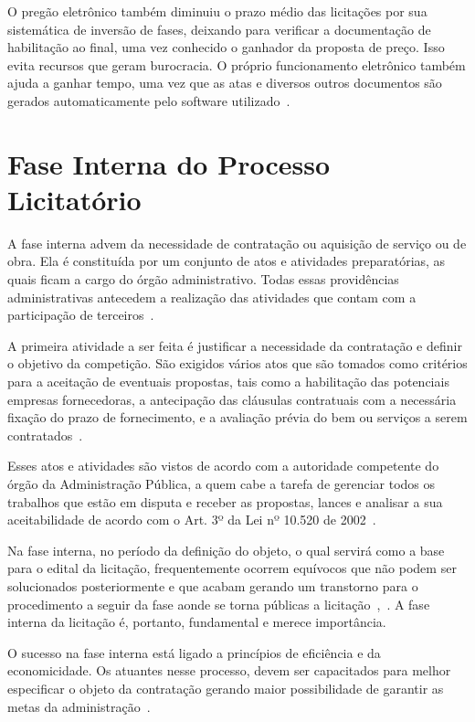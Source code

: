 O pregão eletrônico também diminuiu o prazo médio das licitações por sua sistemática de inversão de fases, deixando para verificar a documentação de habilitação ao final, uma vez conhecido o ganhador da proposta de preço.
Isso evita recursos que geram burocracia. 
O próprio funcionamento eletrônico também ajuda a ganhar tempo, uma vez que as atas e diversos outros documentos são gerados automaticamente pelo software utilizado~\cite{mello2016licitaccao}. 


\chapter[Fase Interna do Processo Licitatório]{Fase Interna do Processo Licitatório}\label{Capitulo2}

A fase interna advem da necessidade de contratação ou aquisição de serviço ou de obra.
Ela é constituída por um conjunto de atos e atividades preparatórias, as quais ficam a cargo do órgão administrativo.
Todas essas providências administrativas antecedem a realização das atividades que contam com a participação de terceiros~\cite{meirelles2011direito}.

A primeira atividade a ser feita é justificar a necessidade da contratação e definir o objetivo da competição.
São exigidos vários atos que são tomados como critérios para a aceitação de eventuais propostas, tais como a habilitação das potenciais empresas fornecedoras, a antecipação das cláusulas contratuais com a necessária fixação do prazo de fornecimento, e a avaliação prévia do bem ou serviços a serem contratados~\cite{carvalho2013manual}.

Esses atos e atividades são vistos de acordo com a autoridade competente do órgão da Administração Pública, a quem cabe a tarefa de gerenciar todos os trabalhos que estão em disputa e receber as propostas, lances e analisar a sua aceitabilidade de acordo com o Art. 3º da Lei nº 10.520 de 2002~\cite{fernandes2005politicas}.

Na fase interna, no período da definição do objeto, o qual servirá como a base para o edital da licitação, frequentemente ocorrem equívocos que não podem ser solucionados posteriormente e que acabam gerando um transtorno para o procedimento a seguir da fase aonde se torna públicas a licitação~\cite{camarao2017fase},~\cite{de2007curso}. 
A fase interna da licitação é, portanto, fundamental e merece importância.

O sucesso na fase interna está ligado a princípios de eficiência e da economicidade.
Os atuantes nesse processo, devem ser capacitados para melhor especificar o objeto da contratação gerando maior possibilidade de garantir as metas da administração~\cite{camarao2017fase}.